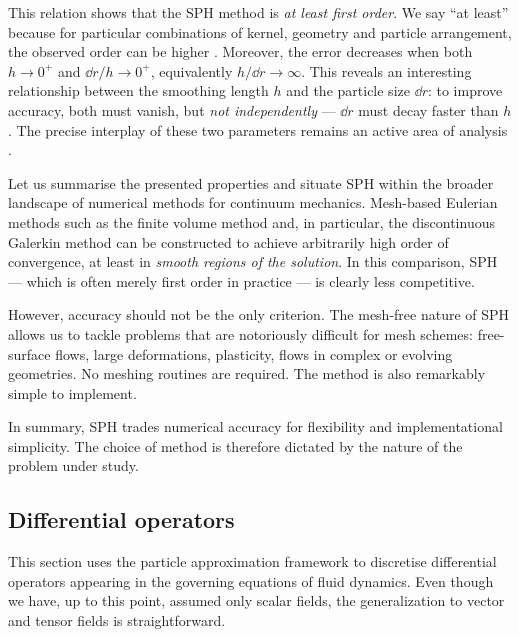 \documentclass[../main.tex]{subfiles}
\begin{document}
This relation shows that the SPH method is \emph{at least first order}. We say \enquote{at least} because for particular combinations of kernel, geometry and particle arrangement, the observed order can be higher \autocite{quinlanTruncationErrorMeshfree2006}. 
Moreover, the error decreases when both $h \to 0^+$ and $\dd{r}/h \to 0^+$, equivalently $h/\dd{r} \to \infty$. This reveals an interesting relationship between the smoothing length $h$ and the particle size $\dd{r}$: to improve accuracy, both must vanish, but \emph{not independently} --- $\dd{r}$ must decay faster than $h$. The precise interplay of these two parameters remains an active area of analysis \autocite{quinlanTruncationErrorMeshfree2006}.


Let us summarise the presented properties and situate SPH within the broader landscape of numerical methods for continuum mechanics. Mesh-based Eulerian methods such as the finite volume method and, in particular, the discontinuous Galerkin method can be constructed to achieve arbitrarily high order of convergence, at least in \emph{smooth regions of the solution}. In this comparison, SPH --- which is often merely first order in practice --- is clearly less competitive.

However, accuracy should not be the only criterion. The mesh-free nature of SPH allows us to tackle problems that are notoriously difficult for mesh schemes: free-surface flows, large deformations, plasticity, flows in complex or evolving geometries. No meshing routines are required. The method is also remarkably simple to implement.

In summary, SPH trades numerical accuracy for flexibility and implementational simplicity. The choice of method is therefore dictated by the nature of the problem under study.

\subsection{Differential operators}
\label{sec:DIFF_OPS}

This section uses the particle approximation framework to discretise differential operators appearing in the governing equations of fluid dynamics. Even though we have, up to this point, assumed only scalar fields, the generalization to vector and tensor fields is straightforward.
\end{document}
